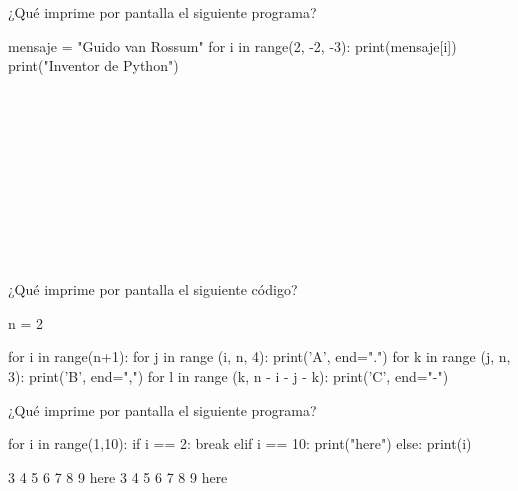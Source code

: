 \begin{ejercicio} 
¿Qué imprime por pantalla el siguiente programa?

\begin{python}
mensaje = "Guido van Rossum"
for i in range(2, -2, -3):
        print(mensaje[i])
print("Inventor de Python")
\end{python}

\begin{choices}
    \choice    %
\\
\\
    \choice
{}\\
\\
\\
\pythoninline{}\\
    \choice 
{}
    \choice
{}\\
\\
\\
\end{choices}


\end{ejercicio}


\begin{ejercicio} ¿Qué imprime por pantalla el siguiente código?

\begin{python}
n = 2

for i in range(n+1):
    for j in range (i, n, 4):
        print('A', end=".")
        for k in range (j, n, 3):
            print('B', end=",")
            for l in range (k, n - i - j - k):
                print('C', end="-")
\end{python}

\begin{choices}
    \choice 
{}
    \choice    %
    \choice 
{}
    \choice 
{}
\end{choices}


\end{ejercicio}

\newpage

\begin{ejercicio} ¿Qué imprime por pantalla el siguiente programa?
 \begin{python}
for i in range(1,10):
    if i == 2:
        break
    elif i == 10:
        print("here")
    else:
        print(i)
\end{python}

\begin{choices}
     3 4 5 6 7 8 9 here
     3 4 5 6 7 8 9
     here
\end{choices}

\end{ejercicio}


